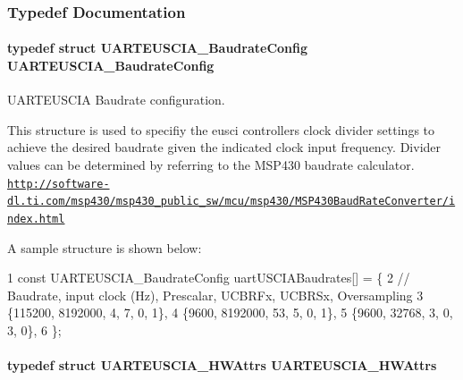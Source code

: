 \subsubsection{Typedef Documentation}
\paragraph[{U\+A\+R\+T\+E\+U\+S\+C\+I\+A\+\_\+\+Baudrate\+Config}]{\setlength{\rightskip}{0pt plus 5cm}typedef struct {\bf U\+A\+R\+T\+E\+U\+S\+C\+I\+A\+\_\+\+Baudrate\+Config}  {\bf U\+A\+R\+T\+E\+U\+S\+C\+I\+A\+\_\+\+Baudrate\+Config}}\label{_u_a_r_t_e_u_s_c_i_a_8h_a2ab5c8b4f9b1bd5b375db37c1fc697e7}


U\+A\+R\+T\+E\+U\+S\+C\+I\+A Baudrate configuration. 

This structure is used to specifiy the eusci controller\textquotesingle{}s clock divider settings to achieve the desired baudrate given the indicated clock input frequency. Divider values can be determined by referring to the M\+S\+P430 baudrate calculator. \href{http://software-dl.ti.com/msp430/msp430_public_sw/mcu/msp430/MSP430BaudRateConverter/index.html}{\tt http\+://software-\/dl.\+ti.\+com/msp430/msp430\+\_\+public\+\_\+sw/mcu/msp430/\+M\+S\+P430\+Baud\+Rate\+Converter/index.\+html}

A sample structure is shown below\+: 
\begin{DoxyCode}
1 const UARTEUSCIA\_BaudrateConfig uartUSCIABaudrates[] = \{
2  // Baudrate, input clock (Hz), Prescalar, UCBRFx, UCBRSx, Oversampling
3     \{115200,  8192000,          4,         7,      0,      1\},
4     \{9600,    8192000,          53,        5,      0,      1\},
5     \{9600,    32768,            3,         0,      3,      0\},
6 \};
\end{DoxyCode}
\paragraph[{U\+A\+R\+T\+E\+U\+S\+C\+I\+A\+\_\+\+H\+W\+Attrs}]{\setlength{\rightskip}{0pt plus 5cm}typedef struct {\bf U\+A\+R\+T\+E\+U\+S\+C\+I\+A\+\_\+\+H\+W\+Attrs}  {\bf U\+A\+R\+T\+E\+U\+S\+C\+I\+A\+\_\+\+H\+W\+Attrs}}\label{_u_a_r_t_e_u_s_c_i_a_8h_ac2776f64ec5846ca87b5ddcd052b551e}


